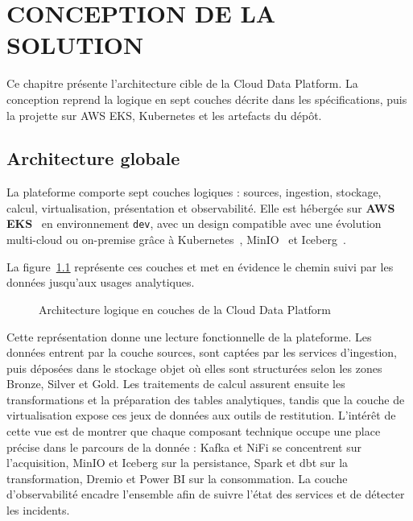 \chapter{CONCEPTION DE LA SOLUTION}
\label{ch:conception}

Ce chapitre présente l'architecture cible de la Cloud Data Platform. La conception reprend la logique en sept couches décrite dans les spécifications, puis la projette sur AWS EKS, Kubernetes et les artefacts du dépôt.

\section{Architecture globale}

La plateforme comporte sept couches logiques : sources, ingestion, stockage, calcul, virtualisation, présentation et observabilité. Elle est hébergée sur \textbf{AWS EKS}~\cite{aws-eks} en environnement \texttt{dev}, avec un design compatible avec une évolution multi-cloud ou on-premise grâce à Kubernetes~\cite{kubernetes}, MinIO~\cite{minio} et Iceberg~\cite{apache-iceberg}.

La figure~\ref{fig:arch-globale} représente ces couches et met en évidence le chemin suivi par les données jusqu'aux usages analytiques.

\begin{figure}[H]
\centering
{}
\caption{Architecture logique en couches de la Cloud Data Platform}
\label{fig:arch-globale}
\end{figure}

Cette représentation donne une lecture fonctionnelle de la plateforme. Les données entrent par la couche sources, sont captées par les services d'ingestion, puis déposées dans le stockage objet où elles sont structurées selon les zones Bronze, Silver et Gold. Les traitements de calcul assurent ensuite les transformations et la préparation des tables analytiques, tandis que la couche de virtualisation expose ces jeux de données aux outils de restitution. L'intérêt de cette vue est de montrer que chaque composant technique occupe une place précise dans le parcours de la donnée : Kafka et NiFi se concentrent sur l'acquisition, MinIO et Iceberg sur la persistance, Spark et dbt sur la transformation, Dremio et Power BI sur la consommation. La couche d'observabilité encadre l'ensemble afin de suivre l'état des services et de détecter les incidents.

